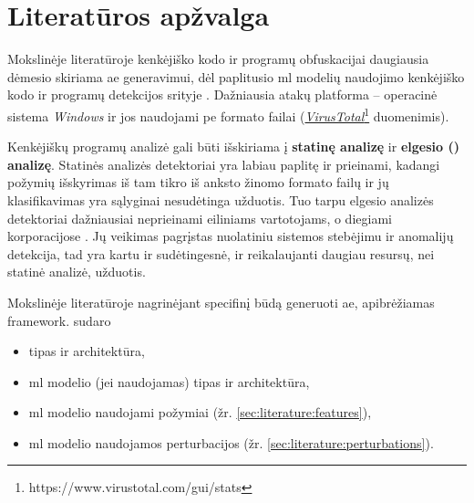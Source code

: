 \section{Literatūros apžvalga}\label{sec:literature}

Mokslinėje literatūroje kenkėjiško kodo ir programų obfuskacijai daugiausia dėmesio skiriama \ac{ae} generavimui, dėl paplitusio \acs{ml} modelių naudojimo kenkėjiško kodo ir programų detekcijos srityje \cite{andersonLearningEvadeStatic2018}. Dažniausia atakų platforma -- operacinė sistema \textit{Windows} ir jos naudojami \acs{pe} formato failai (\href{https://www.virustotal.com/gui/stats}{\textit{VirusTotal}}\footnote{https://www.virustotal.com/gui/stats} duomenimis).

Kenkėjiškų programų analizė gali būti išskiriama į \textbf{statinę analizę} ir \textbf{elgesio () analizę}. Statinės analizės detektoriai yra labiau paplitę ir prieinami, kadangi požymių išskyrimas iš tam tikro iš anksto žinomo formato failų ir jų klasifikavimas yra sąlyginai nesudėtinga užduotis. Tuo tarpu elgesio analizės detektoriai dažniausiai neprieinami eiliniams vartotojams, o diegiami korporacijose \cite{rosenbergGenericBlackBoxEndEnd2018}. Jų veikimas pagrįstas nuolatiniu sistemos stebėjimu ir anomalijų detekcija, tad yra kartu ir sudėtingesnė, ir reikalaujanti daugiau resursų, nei statinė analizė, užduotis.

Mokslinėje literatūroje nagrinėjant specifinį būdą generuoti \acs{ae}, apibrėžiamas \gls{framework}.  sudaro
\begin{itemize}
    \item {} tipas ir architektūra,
    \item \acs{ml} modelio (jei naudojamas) tipas ir architektūra,
    \item \acs{ml} modelio naudojami požymiai (žr. \ref{sec:literature:features}),
    \item \acs{ml} modelio naudojamos perturbacijos (žr. \ref{sec:literature:perturbations}).
\end{itemize}







